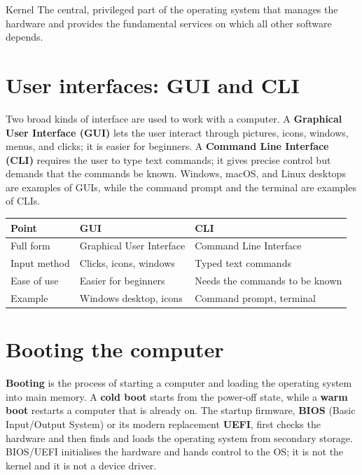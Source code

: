 \begin{definitionbox}{Kernel}
The central, privileged part of the operating system that manages the hardware
and provides the fundamental services on which all other software depends.
\end{definitionbox}

\section{User interfaces: GUI and CLI}
Two broad kinds of interface are used to work with a computer. A
\textbf{Graphical User Interface (GUI)} lets the user interact through
pictures, icons, windows, menus, and clicks; it is easier for beginners. A
\textbf{Command Line Interface (CLI)} requires the user to type text commands;
it gives precise control but demands that the commands be known. Windows,
macOS, and Linux desktops are examples of GUIs, while the command prompt and
the terminal are examples of CLIs.

\begin{center}
\begin{tabular}{p{}p{}p{}}
\toprule
\textbf{Point} & \textbf{GUI} & \textbf{CLI} \\
\midrule
Full form & Graphical User Interface & Command Line Interface \\
Input method & Clicks, icons, windows & Typed text commands \\
Ease of use & Easier for beginners & Needs the commands to be known \\
Example & Windows desktop, icons & Command prompt, terminal \\
\bottomrule
\end{tabular}
\end{center}

\section{Booting the computer}
\textbf{Booting} is the process of starting a computer and loading the
operating system into main memory. A \textbf{cold boot} starts from the
power-off state, while a \textbf{warm boot} restarts a computer that is already
on. The startup firmware, \textbf{BIOS} (Basic Input/Output System) or its
modern replacement \textbf{UEFI}, first checks the hardware and then finds and
loads the operating system from secondary storage. BIOS/UEFI initialises the
hardware and hands control to the OS; it is not the kernel and it is not a
device driver.

